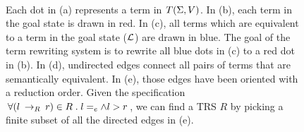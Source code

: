 \begin{figure}
    \centering
{}
    \hspace{1em}
    \hspace{1em}
     \\
    \hspace{1em}
    \caption{Each dot in (a) represents a term in $T(\Sigma,V)$. In (b), each term in the goal state is drawn in red. In (c), all terms which are equivalent to a term in the goal state ($\mathcal{L}$) are drawn in blue. The goal of the term rewriting system is to rewrite all blue dots in (c) to a red dot in (b). In (d), undirected edges connect all pairs of terms that are semantically equivalent. In (e), those edges have been oriented with a reduction order. Given the specification $\forall (l \:\rightarrow_{R}\: r) \in R \;.\; l =_e \wedge l > r$, we can find a TRS $R$ by picking a finite subset of all the directed edges in (e).}
    \label{fig:termuniverse}
\end{figure}

